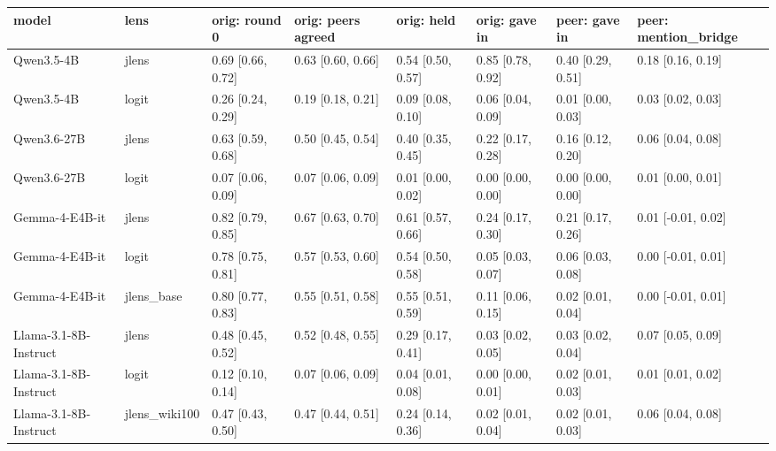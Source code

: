 \begin{tabular}{llllllll}
\toprule
model & lens & orig: round 0 & orig: peers agreed & orig: held & orig: gave in & peer: gave in & peer: mention\_bridge \\
\midrule
Qwen3.5-4B & jlens & 0.69 [0.66, 0.72] & 0.63 [0.60, 0.66] & 0.54 [0.50, 0.57] & 0.85 [0.78, 0.92] & 0.40 [0.29, 0.51] & 0.18 [0.16, 0.19] \\
Qwen3.5-4B & logit & 0.26 [0.24, 0.29] & 0.19 [0.18, 0.21] & 0.09 [0.08, 0.10] & 0.06 [0.04, 0.09] & 0.01 [0.00, 0.03] & 0.03 [0.02, 0.03] \\
Qwen3.6-27B & jlens & 0.63 [0.59, 0.68] & 0.50 [0.45, 0.54] & 0.40 [0.35, 0.45] & 0.22 [0.17, 0.28] & 0.16 [0.12, 0.20] & 0.06 [0.04, 0.08] \\
Qwen3.6-27B & logit & 0.07 [0.06, 0.09] & 0.07 [0.06, 0.09] & 0.01 [0.00, 0.02] & 0.00 [0.00, 0.00] & 0.00 [0.00, 0.00] & 0.01 [0.00, 0.01] \\
Gemma-4-E4B-it & jlens & 0.82 [0.79, 0.85] & 0.67 [0.63, 0.70] & 0.61 [0.57, 0.66] & 0.24 [0.17, 0.30] & 0.21 [0.17, 0.26] & 0.01 [-0.01, 0.02] \\
Gemma-4-E4B-it & logit & 0.78 [0.75, 0.81] & 0.57 [0.53, 0.60] & 0.54 [0.50, 0.58] & 0.05 [0.03, 0.07] & 0.06 [0.03, 0.08] & 0.00 [-0.01, 0.01] \\
Gemma-4-E4B-it & jlens\_base & 0.80 [0.77, 0.83] & 0.55 [0.51, 0.58] & 0.55 [0.51, 0.59] & 0.11 [0.06, 0.15] & 0.02 [0.01, 0.04] & 0.00 [-0.01, 0.01] \\
Llama-3.1-8B-Instruct & jlens & 0.48 [0.45, 0.52] & 0.52 [0.48, 0.55] & 0.29 [0.17, 0.41] & 0.03 [0.02, 0.05] & 0.03 [0.02, 0.04] & 0.07 [0.05, 0.09] \\
Llama-3.1-8B-Instruct & logit & 0.12 [0.10, 0.14] & 0.07 [0.06, 0.09] & 0.04 [0.01, 0.08] & 0.00 [0.00, 0.01] & 0.02 [0.01, 0.03] & 0.01 [0.01, 0.02] \\
Llama-3.1-8B-Instruct & jlens\_wiki100 & 0.47 [0.43, 0.50] & 0.47 [0.44, 0.51] & 0.24 [0.14, 0.36] & 0.02 [0.01, 0.04] & 0.02 [0.01, 0.03] & 0.06 [0.04, 0.08] \\
\bottomrule
\end{tabular}

